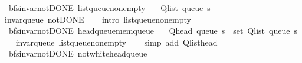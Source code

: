\begin{isabellebody}
\isanewline
%
\endisadelimproof
\isanewline
{}\isamarkupfalse%
\ {\isacharparenleft}{\kern0pt}\ bfs{\isacharunderscore}{\kern0pt}invar{\isacharunderscore}{\kern0pt}not{\isacharunderscore}{\kern0pt}DONE{\isacharparenright}{\kern0pt}\ list{\isacharunderscore}{\kern0pt}queue{\isacharunderscore}{\kern0pt}non{\isacharunderscore}{\kern0pt}empty{\isacharcolon}{\kern0pt}\isanewline
\ \ \ {\isachardoublequoteopen}Q{\isacharunderscore}{\kern0pt}list\ {\isacharparenleft}{\kern0pt}queue\ s{\isacharparenright}{\kern0pt}\ {\isasymnoteq}\ {\isacharbrackleft}{\kern0pt}{\isacharbrackright}{\kern0pt}{\isachardoublequoteclose}\isanewline
%
\isadelimproof
\ \ %
\endisadelimproof
%
\isatagproof
{}\isamarkupfalse%
\ invar{\isacharunderscore}{\kern0pt}queue\ not{\isacharunderscore}{\kern0pt}DONE\isanewline
\ \ \isamarkupfalse%
\ {\isacharparenleft}{\kern0pt}intro\ list{\isacharunderscore}{\kern0pt}queue{\isacharunderscore}{\kern0pt}non{\isacharunderscore}{\kern0pt}empty{\isacharparenright}{\kern0pt}%
\endisatagproof
{\isafoldproof}%
%
\isadelimproof
\isanewline
%
\endisadelimproof
\isanewline
{}\isamarkupfalse%
\ {\isacharparenleft}{\kern0pt}\ bfs{\isacharunderscore}{\kern0pt}invar{\isacharunderscore}{\kern0pt}not{\isacharunderscore}{\kern0pt}DONE{\isacharparenright}{\kern0pt}\ head{\isacharunderscore}{\kern0pt}queue{\isacharunderscore}{\kern0pt}mem{\isacharunderscore}{\kern0pt}queue{\isacharcolon}{\kern0pt}\isanewline
\ \ \ {\isachardoublequoteopen}Q{\isacharunderscore}{\kern0pt}head\ {\isacharparenleft}{\kern0pt}queue\ s{\isacharparenright}{\kern0pt}\ {\isasymin}\ set\ {\isacharparenleft}{\kern0pt}Q{\isacharunderscore}{\kern0pt}list\ {\isacharparenleft}{\kern0pt}queue\ s{\isacharparenright}{\kern0pt}{\isacharparenright}{\kern0pt}{\isachardoublequoteclose}\isanewline
%
\isadelimproof
\ \ %
\endisadelimproof
%
\isatagproof
{}\isamarkupfalse%
\ invar{\isacharunderscore}{\kern0pt}queue\ list{\isacharunderscore}{\kern0pt}queue{\isacharunderscore}{\kern0pt}non{\isacharunderscore}{\kern0pt}empty\isanewline
\ \ \isamarkupfalse%
\ {\isacharparenleft}{\kern0pt}simp\ add{\isacharcolon}{\kern0pt}\ Q{\isachardot}{\kern0pt}list{\isacharunderscore}{\kern0pt}head{\isacharparenright}{\kern0pt}%
\endisatagproof
{\isafoldproof}%
%
\isadelimproof
\isanewline
%
\endisadelimproof
\isanewline
{}\isamarkupfalse%
\ {\isacharparenleft}{\kern0pt}\ bfs{\isacharunderscore}{\kern0pt}invar{\isacharunderscore}{\kern0pt}not{\isacharunderscore}{\kern0pt}DONE{\isacharparenright}{\kern0pt}\ not{\isacharunderscore}{\kern0pt}white{\isacharunderscore}{\kern0pt}head{\isacharunderscore}{\kern0pt}queue{\isacharcolon}{\kern0pt}\isanewline

\end{isabellebody}
